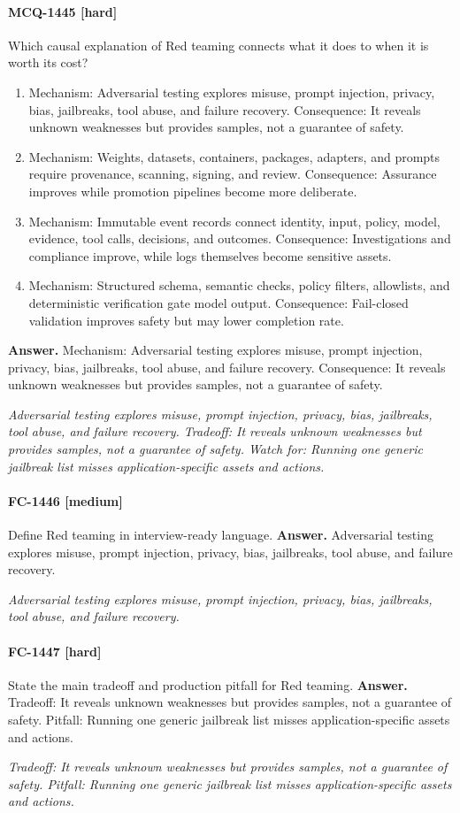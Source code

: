 \paragraph{MCQ-1445 [hard]} Which causal explanation of Red teaming connects what it does to when it is worth its cost?
\begin{enumerate}[label=\Alph*.]
\item Mechanism: Adversarial testing explores misuse, prompt injection, privacy, bias, jailbreaks, tool abuse, and failure recovery. Consequence: It reveals unknown weaknesses but provides samples, not a guarantee of safety.
\item Mechanism: Weights, datasets, containers, packages, adapters, and prompts require provenance, scanning, signing, and review. Consequence: Assurance improves while promotion pipelines become more deliberate.
\item Mechanism: Immutable event records connect identity, input, policy, model, evidence, tool calls, decisions, and outcomes. Consequence: Investigations and compliance improve, while logs themselves become sensitive assets.
\item Mechanism: Structured schema, semantic checks, policy filters, allowlists, and deterministic verification gate model output. Consequence: Fail-closed validation improves safety but may lower completion rate.
\end{enumerate}
\noindent\textbf{Answer.} Mechanism: Adversarial testing explores misuse, prompt injection, privacy, bias, jailbreaks, tool abuse, and failure recovery. Consequence: It reveals unknown weaknesses but provides samples, not a guarantee of safety.
\par\textit{Adversarial testing explores misuse, prompt injection, privacy, bias, jailbreaks, tool abuse, and failure recovery. Tradeoff: It reveals unknown weaknesses but provides samples, not a guarantee of safety. Watch for: Running one generic jailbreak list misses application-specific assets and actions.}
\paragraph{FC-1446 [medium]} Define Red teaming in interview-ready language.
\noindent\textbf{Answer.} Adversarial testing explores misuse, prompt injection, privacy, bias, jailbreaks, tool abuse, and failure recovery.
\par\textit{Adversarial testing explores misuse, prompt injection, privacy, bias, jailbreaks, tool abuse, and failure recovery.}
\paragraph{FC-1447 [hard]} State the main tradeoff and production pitfall for Red teaming.
\noindent\textbf{Answer.} Tradeoff: It reveals unknown weaknesses but provides samples, not a guarantee of safety. Pitfall: Running one generic jailbreak list misses application-specific assets and actions.
\par\textit{Tradeoff: It reveals unknown weaknesses but provides samples, not a guarantee of safety. Pitfall: Running one generic jailbreak list misses application-specific assets and actions.}
